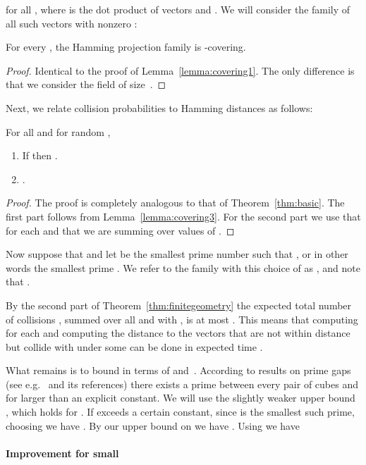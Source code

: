 \documentclass[prodmode,acmtalg]{acmsmall}
\begin{document}
for all , where  is the dot product of vectors  and .
We will consider the family of all such vectors with nonzero :




\begin{lemma}\label{lemma:covering3}
For every , the Hamming projection family  is -covering.
\end{lemma}
\begin{proof}
	Identical to the proof of Lemma~\ref{lemma:covering1}. The only difference is that we consider the field  of size~.
\end{proof}



Next, we relate collision probabilities to Hamming distances as follows:
\begin{theorem}\label{thm:finitegeometry}
	For all  and for random ,
	\begin{enumerate}
\item If  then .
\item .
\end{enumerate}
\end{theorem}
\begin{proof}
The proof is completely analogous to that of Theorem~\ref{thm:basic}. 
The first part follows from Lemma~\ref{lemma:covering3}.
For the second part we use that  for each  and that we are summing over  values of .
\end{proof}

Now suppose that  and let  be the smallest prime number such that , or in other words the smallest prime . We refer to the family  with this choice of  as , and note that .

By the second part of Theorem~\ref{thm:finitegeometry} the expected total number of collisions , summed over all  and  with , is at most .
This means that computing  for each  and computing the distance to the vectors that are not within distance  but collide with  under some  can be done in expected time .

What remains is to bound  in terms of  and~.
According to results on prime gaps (see e.g.~\cite{dudek2014explicit} and its references)
there exists a prime between every pair of cubes  and  for  larger than an explicit constant.
We will use the slightly weaker upper bound , which holds for .
If  exceeds a certain constant, since  is the smallest such prime, choosing  we have .
By our upper bound on  we have .
Using  we have



\paragraph{Improvement for small }
\end{document}

